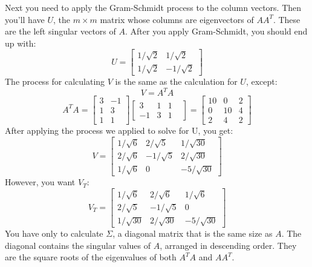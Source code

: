 Next you need to apply the Gram-Schmidt process to the column vectors. Then you'll have $U$, the $m \times m$ matrix whose columns are eigenvectors of $AA^T$. These are the left singular vectors of $A$. After you apply Gram-Schmidt, you should end up with:
$$
U = \begin{bmatrix}
1/\sqrt{2} & 1/\sqrt{2} \\
1/\sqrt{2} & -1/\sqrt{2} 
\end{bmatrix}
$$
The process for calculating $V$ is the same as the calculation for $U$, except:
$$V = A^TA$$ 
$$A^TA = 
\begin{bmatrix}
3 & -1\\
1 & 3\\
1 & 1
\end{bmatrix}
\begin{bmatrix}
3 & 1 & 1\\
-1 & 3 & 1&
\end{bmatrix}
=
\begin{bmatrix}
10 & 0 & 2 \\
0 & 10 & 4 \\
2 & 4 & 2
\end{bmatrix}
$$
After applying the process we applied to solve for U, you get:
$$
V = \begin{bmatrix}
1/\sqrt{6} & 2/\sqrt{5} & 1/\sqrt{30} \\
2/\sqrt{6} & -1/\sqrt{5} & 2/\sqrt{30}\\
1/\sqrt{6} & 0 & -5/\sqrt{30}
\end{bmatrix}
$$
However, you want $V_T$:
$$
V_T =
\begin{bmatrix}
1/\sqrt{6} & 2/\sqrt{6} & 1/\sqrt{6} \\
2/\sqrt{5} & -1/\sqrt{5} & 0\\
1/\sqrt{30} & 2/\sqrt{30} & -5/\sqrt{30}
\end{bmatrix}
$$
You have only to calculate $\Sigma$, a diagonal matrix that is the same size as $A$. The diagonal contains the singular values of $A$, arranged in descending order. They are the square roots of the eigenvalues of both $A^TA$ and $AA^T$.

